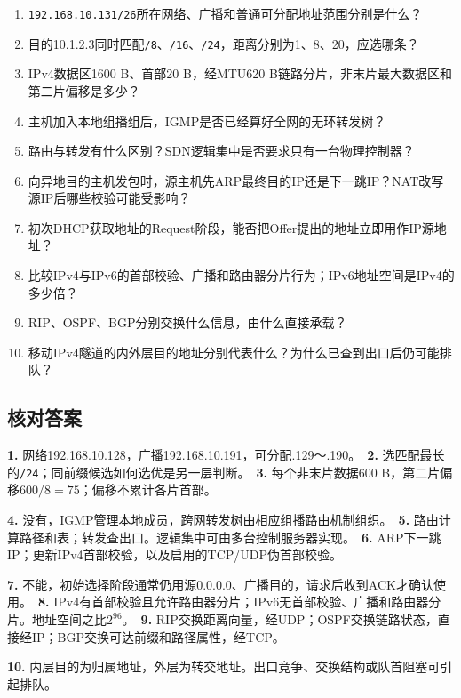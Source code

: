 \begin{enumerate}
\def\labelenumi{\arabic{enumi}.}
\tightlist
\item
  \texttt{192.\allowbreak{}168.\allowbreak{}10.\allowbreak{}131/\allowbreak{}26}所在网络、广播和普通可分配地址范围分别是什么？
\item
  目的10.1.2.3同时匹配\texttt{/\allowbreak{}8}、\texttt{/\allowbreak{}16}、\texttt{/\allowbreak{}24}，距离分别为1、8、20，应选哪条？
\item
  IPv4数据区1600 B、首部20 B，经MTU620 B链路分片，非末片最大数据区和第二片偏移是多少？
\item
  主机加入本地组播组后，IGMP是否已经算好全网的无环转发树？
\item
  路由与转发有什么区别？SDN逻辑集中是否要求只有一台物理控制器？
\item
  向异地目的主机发包时，源主机先ARP最终目的IP还是下一跳IP？NAT改写源IP后哪些校验可能受影响？
\item
  初次DHCP获取地址的Request阶段，能否把Offer提出的地址立即用作IP源地址？
\item
  比较IPv4与IPv6的首部校验、广播和路由器分片行为；IPv6地址空间是IPv4的多少倍？
\item
  RIP、OSPF、BGP分别交换什么信息，由什么直接承载？
\item
  移动IPv4隧道的内外层目的地址分别代表什么？为什么已查到出口后仍可能排队？
\end{enumerate}

\subsection{核对答案}\label{CN04-review-answers}

\textbf{1.} 网络192.168.10.128，广播192.168.10.191，可分配.129～.190。　\textbf{2.} 选匹配最长的\texttt{/\allowbreak{}24}；同前缀候选如何选优是另一层判断。　\textbf{3.} 每个非末片数据600 B，第二片偏移\(600/8=75\)；偏移不累计各片首部。

\textbf{4.} 没有，IGMP管理本地成员，跨网转发树由相应组播路由机制组织。　\textbf{5.} 路由计算路径和表；转发查出口。逻辑集中可由多台控制服务器实现。　\textbf{6.} ARP下一跳IP；更新IPv4首部校验，以及启用的TCP/UDP伪首部校验。

\textbf{7.} 不能，初始选择阶段通常仍用源0.0.0.0、广播目的，请求后收到ACK才确认使用。　\textbf{8.} IPv4有首部校验且允许路由器分片；IPv6无首部校验、广播和路由器分片。地址空间之比\(2^{96}\)。　\textbf{9.} RIP交换距离向量，经UDP；OSPF交换链路状态，直接经IP；BGP交换可达前缀和路径属性，经TCP。

\textbf{10.} 内层目的为归属地址，外层为转交地址。出口竞争、交换结构或队首阻塞可引起排队。
